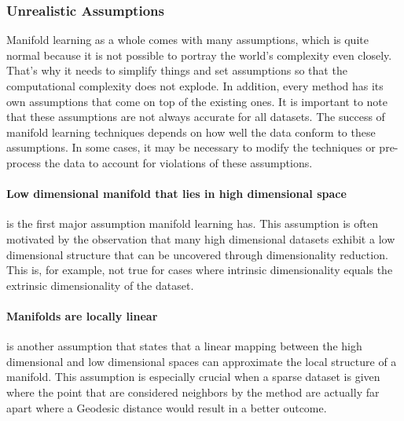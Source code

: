 \subsubsection{Unrealistic Assumptions}

Manifold learning as a whole comes with many assumptions, which is quite normal because it is not possible to portray the world's complexity even closely. That's why it needs to simplify things and set assumptions so that the computational complexity does not explode. In addition, every method has its own assumptions that come on top of the existing ones. It is important to note that these assumptions are not always accurate for all datasets. The success of manifold learning techniques depends on how well the data conform to these assumptions. In some cases, it may be necessary to modify the techniques or pre-process the data to account for violations of these assumptions.

\paragraph{Low dimensional manifold that lies in high dimensional space} is the first major assumption manifold learning has. This assumption is often motivated by the observation that many high dimensional datasets exhibit a low dimensional structure that can be uncovered through dimensionality reduction. This is, for example, not true for cases where intrinsic dimensionality equals the extrinsic dimensionality of the dataset. \cite{Cayton05}

\paragraph{Manifolds are locally linear} is another assumption that states that a linear mapping between the high dimensional and low dimensional spaces can approximate the local structure of a manifold. This assumption is especially crucial when a sparse dataset is given where the point that are considered neighbors by the method are actually far apart where a Geodesic distance would result in a better outcome. \cite{t-SNE08}

